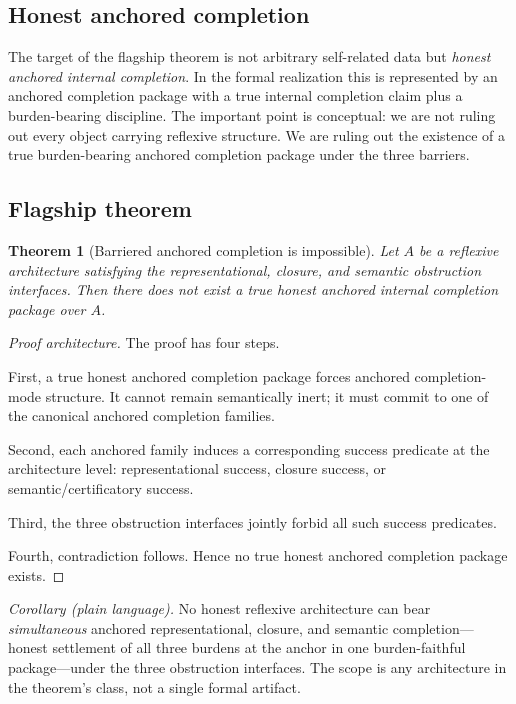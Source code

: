 \documentclass[11pt]{article}
\theoremstyle{plain}
\newtheorem{theorem}{Theorem}[section]
\theoremstyle{definition}
\theoremstyle{remark}
\begin{document}
\subsection{Honest anchored completion}

The target of the flagship theorem is not arbitrary self-related data but \emph{honest anchored internal completion}. In the formal realization this is represented by an anchored completion package with a true internal completion claim plus a burden-bearing discipline. The important point is conceptual: we are not ruling out every object carrying reflexive structure. We are ruling out the existence of a true burden-bearing anchored completion package under the three barriers.

\subsection{Flagship theorem}

\begin{theorem}[Barriered anchored completion is impossible]\label{theorem:barriered-anchored}
Let \(A\) be a reflexive architecture satisfying the representational, closure, and semantic obstruction interfaces. Then there does not exist a true honest anchored internal completion package over \(A\).
\end{theorem}

\begin{proof}[Proof architecture]
The proof has four steps.

First, a true honest anchored completion package forces anchored completion-mode structure. It cannot remain semantically inert; it must commit to one of the canonical anchored completion families.

Second, each anchored family induces a corresponding success predicate at the architecture level: representational success, closure success, or semantic/certificatory success.

Third, the three obstruction interfaces jointly forbid all such success predicates.

Fourth, contradiction follows. Hence no true honest anchored completion package exists.
\end{proof}

\noindent\emph{Corollary (plain language).} No honest reflexive architecture can bear \emph{simultaneous} anchored representational, closure, and semantic completion---honest settlement of all three burdens at the anchor in one burden-faithful package---under the three obstruction interfaces. The scope is any architecture in the theorem's class, not a single formal artifact.
\end{document}
